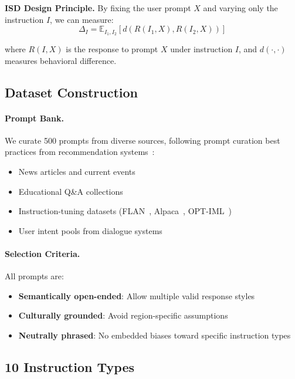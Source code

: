 \textbf{ISD Design Principle.} By fixing the user prompt $X$ and varying only the instruction $I$, we can measure:
\begin{equation}
\Delta_I = \mathbb{E}_{I_1, I_2}\left[ d\left( R(I_1, X), R(I_2, X) \right) \right]
\label{eq:isd_metric}
\end{equation}

where $R(I, X)$ is the response to prompt $X$ under instruction $I$, and $d(\cdot, \cdot)$ measures behavioral difference.

\vspace{-2mm}
\subsection{Dataset Construction}
\label{sec:isd_construction}

\paragraph{Prompt Bank.} We curate 500 prompts from diverse sources, following prompt curation best practices from recommendation systems~\cite{yang2023prompt}:
\begin{itemize}[leftmargin=*,itemsep=1pt]
    \item News articles and current events
    \item Educational Q\&A collections
    \item Instruction-tuning datasets (FLAN~\cite{wei2022finetuned}, Alpaca~\cite{taori2023alpaca}, OPT-IML~\cite{iyer2022optiml})
    \item User intent pools from dialogue systems
\end{itemize}

\paragraph{Selection Criteria.} All prompts are:
\begin{itemize}[leftmargin=*,itemsep=1pt]
    \item \textbf{Semantically open-ended}: Allow multiple valid response styles
    \item \textbf{Culturally grounded}: Avoid region-specific assumptions
    \item \textbf{Neutrally phrased}: No embedded biases toward specific instruction types
\end{itemize}

\vspace{-2mm}
\subsection{10 Instruction Types}
\label{sec:instruction_types}

